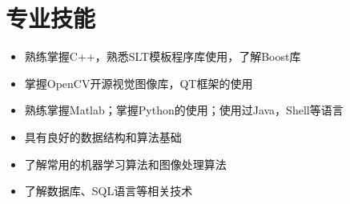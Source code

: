 ﻿\documentclass[[a4paper,12pt]{article}
\begin{document}

\section{专业技能}


\begin{itemize}
\setlength{\itemsep}{0pt}
\item 熟练掌握C++，熟悉SLT模板程序库使用，了解Boost库
\item 掌握OpenCV开源视觉图像库，QT框架的使用
\item 熟练掌握Matlab；掌握Python的使用；使用过Java，Shell等语言
\item 具有良好的数据结构和算法基础
\item 了解常用的机器学习算法和图像处理算法
\item 了解数据库、SQL语言等相关技术
\end{itemize}
\vspace{-3em}
\end{document}
